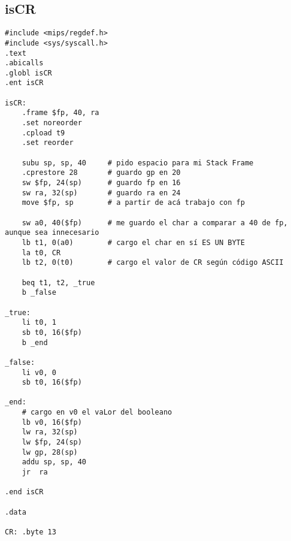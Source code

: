 \documentclass[a4paper,11pt]{article}
\begin{document}
\subsection{isCR}
\begin{verbatim}
#include <mips/regdef.h>
#include <sys/syscall.h>
.text
.abicalls
.globl isCR
.ent isCR

isCR:
	.frame $fp, 40, ra
	.set noreorder
	.cpload t9
	.set reorder

	subu sp, sp, 40 	# pido espacio para mi Stack Frame
	.cprestore 28		# guardo gp en 20
	sw $fp, 24(sp)		# guardo fp en 16
	sw ra, 32(sp)		# guardo ra en 24
	move $fp, sp		# a partir de acá trabajo con fp

	sw a0, 40($fp)		# me guardo el char a comparar a 40 de fp, aunque sea innecesario
	lb t1, 0(a0)		# cargo el char en sí ES UN BYTE
	la t0, CR			
	lb t2, 0(t0)		# cargo el valor de CR según código ASCII

	beq t1, t2, _true
	b _false

_true:
	li t0, 1
	sb t0, 16($fp)
	b _end

_false:
	li v0, 0
	sb t0, 16($fp)

_end:
	# cargo en v0 el vaLor del booleano
	lb v0, 16($fp)
	lw ra, 32(sp)
	lw $fp, 24(sp)
	lw gp, 28(sp)
	addu sp, sp, 40
	jr	ra

.end isCR

.data

CR: .byte 13
\end{verbatim}
\end{document}
